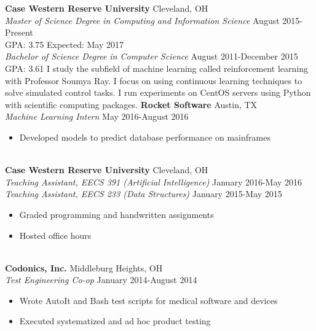 \documentclass[11pt]{article}
\begin{document}
\begin{adjustwidth}{-2.2cm}{-2.2cm}
    \textbf{Case Western Reserve University} \hfill Cleveland, OH\\
    \emph{Master of Science Degree in Computing and Information Science} \hfill August 2015-Present\\
    GPA: 3.75 \hfill Expected: May 2017
    \\[2ex]
    \emph{Bachelor of Science Degree in Computer Science} \hfill August 2011-December 2015\\
    GPA: 3.61
    \eosec
    I study the subfield of machine learning called reinforcement learning with Professor Soumya Ray. I focus on using continuous learning techniques to solve simulated control tasks. I run experiments on CentOS servers using Python with scientific computing packages.
    \eosec
    \textbf{Rocket Software} \hfill Austin, TX\\
    \emph{Machine Learning Intern} \hfill May 2016-August 2016
    \begin{itemize}[nosep]
        \item Developed models to predict database performance on mainframes
    \end{itemize}
    ~\\[0.01\baselineskip]
    \textbf{Case Western Reserve University} \hfill Cleveland, OH\\
    \emph{Teaching Assistant, EECS 391 (Artificial Intelligence)} \hfill January 2016-May 2016\\
    \emph{Teaching Assistant, EECS 233 (Data Structures)} \hfill January 2015-May 2015
    \begin{itemize}[nosep]
        \item Graded programming and handwritten assignments
        \item Hosted office hours
    \end{itemize}
    ~\\[0.01\baselineskip]
    \textbf{Codonics, Inc.} \hfill Middleburg Heights, OH\\
    \emph{Test Engineering Co-op} \hfill January 2014-August 2014
    \begin{itemize}[nosep]
        \item Wrote AutoIt and Bash test scripts for medical software and devices
        \item Executed systematized and ad hoc product testing
    \end{itemize}

\end{adjustwidth}
\end{document}
